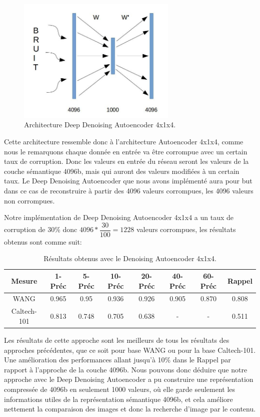 \begin{figure}[H]
	\centering
		\includegraphics[width=3in]{Figures/ae/denoising.jpg}
	\caption[An Electron]{Architecture Deep Denoising Autoencoder 4x1x4.}
	\label{fig:Electron}
\end{figure}

	Cette architecture ressemble donc à l'architecture Autoencoder 4x1x4, comme nous le remarquons chaque donnée en entrée va être corrompue avec un certain taux de corruption. Donc les valeurs en entrée du réseau seront les valeurs de la couche sémantique 4096b, mais qui auront des valeurs modifiées à un certain taux. Le Deep Denoising Autoencoder que nous avons implémenté aura pour but dans ce cas de reconstruire à partir des 4096 valeurs corrompues, les 4096 valeurs non corrompues.
	
	Notre implémentation de Deep Denoising Autoencoder 4x1x4  a un taux de corruption de 30\% donc $4096 * \dfrac{30}{100} = 1228$ valeurs corrompues, les résultats obtenus sont comme suit:


\begin{table}[H]
\begin{center}
\begin{tabular}{|c|c|c|c|c|c|c|c|}
\hline
	Mesure & 1-Préc & 5-Préc & 10-Préc & 20-Préc & 40-Préc & 60-Préc & Rappel\\
\hline
	WANG & 0.965 & 0.95 & 0.936 & 0.926 & 0.905 & 0.870 & 0.808\\
\hline
	Caltech-101 & 0.813 & 0.748 & 0.705 & 0.638 & - & - & 0.511\\
\hline
\end{tabular}
\end{center}
\caption{Résultats obtenus avec le Denoising Autoencoder 4x1x4.}
\end{table}

	Les résultats de cette approche sont les meilleurs de tous les résultats des approches précédentes, que ce soit pour base WANG ou pour la base Caltech-101. Une amélioration des performances allant jusqu'à 10\% dans le Rappel par rapport à l'approche de la couche 4096b.
	Nous pouvons donc déduire que notre approche avec le Deep Denoising Autoencoder a pu construire une représentation compressée de 4096b en seulement 1000 valeurs, où elle garde seulement les informations utiles de la représentation sémantique 4096b, et cela améliore nettement la comparaison des images et donc la recherche d'image par le contenu. 


